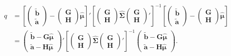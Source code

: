 \documentclass[12pt]{article}
\def\PQ{\begin{pmatrix}\bm{G}\\[-0.2cm]\bm{H}\end{pmatrix}}
\def\bt{\begin{pmatrix}\tilde{\bm{b}}\\[-0.2cm]\tilde{\bm{a}}\end{pmatrix}}
\theoremstyle{definition}
\begin{document}
\begin{align*}
	q& =%
	\left[\bt-\PQ\hat{\bm{\mu}}\right]'%
	\left[\PQ\hat{\bm{\Sigma}}\PQ'\right]^{-1}\left[\bt-\PQ\hat{\bm{\mu}}\right] %
	\\[0.5cm]
	& =%
	\begin{pmatrix}\tilde{\bm{b}} - \bm{G}\hat{\bm{\mu}}\\ \tilde{\bm{a}}- \bm{H}\hat{\bm{\mu}}\end{pmatrix}' %
	\left[\PQ\hat{\bm{\Sigma}}\PQ'\right]^{-1}\begin{pmatrix}\tilde{\bm{b}} - \bm{G}\hat{\bm{\mu}}\\ \tilde{\bm{a}}- \bm{H}\hat{\bm{\mu}}\end{pmatrix}. %
\end{align*}
\end{document}
